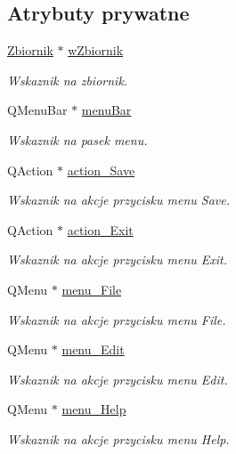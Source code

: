 \subsection*{Atrybuty prywatne}
\begin{DoxyCompactItemize}
\item 
\hyperlink{class_zbiornik}{Zbiornik} $\ast$ \hyperlink{class_okno_glowne_af2d1275209898ebdd5ab9de8ef78dffd}{w\+Zbiornik}
\begin{DoxyCompactList}\small\item\em Wskaznik na zbiornik. \end{DoxyCompactList}\item 
Q\+Menu\+Bar $\ast$ \hyperlink{class_okno_glowne_a5a87098d9d4bd868670f5a5e72023a0a}{menu\+Bar}
\begin{DoxyCompactList}\small\item\em Wskaznik na pasek menu. \end{DoxyCompactList}\item 
Q\+Action $\ast$ \hyperlink{class_okno_glowne_a2c2d825b6e5e0faa5eb368be4fc73b78}{action\+\_\+\+Save}
\begin{DoxyCompactList}\small\item\em Wskaznik na akcje przycisku menu Save. \end{DoxyCompactList}\item 
Q\+Action $\ast$ \hyperlink{class_okno_glowne_a579ef9901f57057368cb522ea5a9a5c3}{action\+\_\+\+Exit}
\begin{DoxyCompactList}\small\item\em Wskaznik na akcje przycisku menu Exit. \end{DoxyCompactList}\item 
Q\+Menu $\ast$ \hyperlink{class_okno_glowne_a1ba162db2d0b06b0f8963e61b3806875}{menu\+\_\+\+File}
\begin{DoxyCompactList}\small\item\em Wskaznik na akcje przycisku menu File. \end{DoxyCompactList}\item 
Q\+Menu $\ast$ \hyperlink{class_okno_glowne_a93afadd0ec22ce6a7e29acc5dd2423a2}{menu\+\_\+\+Edit}
\begin{DoxyCompactList}\small\item\em Wskaznik na akcje przycisku menu Edit. \end{DoxyCompactList}\item 
Q\+Menu $\ast$ \hyperlink{class_okno_glowne_ab17be6714913af0cdf4e7de7cb6210d1}{menu\+\_\+\+Help}
\begin{DoxyCompactList}\small\item\em Wskaznik na akcje przycisku menu Help. \end{DoxyCompactList}\item 

\end{DoxyCompactItemize}
